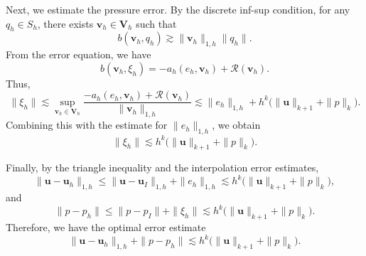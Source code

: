 \documentclass[review,hidelinks,onefignum,onetabnum]{siamart251216}
\begin{document}
Next, we estimate the pressure error. By the discrete inf-sup condition, for any \(q_h\in S_h\), there exists 
\(\boldsymbol{v}_h\in \boldsymbol{V}_h\) such that
\[
b(\boldsymbol{v}_h, q_h) \gtrsim \|\boldsymbol{v}_h\|_{1,h} \|q_h\|.
\]
From the error equation, we have
\[
b(\boldsymbol{v}_h, \xi_h) = -a_h(e_h, \boldsymbol{v}_h) + \mathcal{R}(\boldsymbol{v}_h).
\]
Thus,
\[
\|\xi_h\| 
\lesssim \sup_{\boldsymbol{v}_h\in \boldsymbol{V}_h} 
\frac{-a_h(e_h, \boldsymbol{v}_h) + \mathcal{R}(\boldsymbol{v}_h)}{\|\boldsymbol{v}_h\|_{1,h}}
\lesssim \|e_h\|_{1,h} + h^k \bigl(\|\boldsymbol{u}\|_{k+1} + \|p\|_k\bigr).
\]
Combining this with the estimate for \(\|e_h\|_{1,h}\), we obtain
\[
\|\xi_h\| \lesssim h^k \bigl(\|\boldsymbol{u}\|_{k+1} + \|p\|_k\bigr).
\]

Finally, by the triangle inequality and the interpolation error estimates,
\[
\|\boldsymbol{u} - \boldsymbol{u}_h\|_{1,h} 
\le \|\boldsymbol{u} - \boldsymbol{u}_I\|_{1,h} + \|e_h\|_{1,h} 
\lesssim h^k \bigl(\|\boldsymbol{u}\|_{k+1} + \|p\|_k\bigr),
\]
and
\[
\|p - p_h\| 
\le \|p - p_I\| + \|\xi_h\| 
\lesssim h^k \bigl(\|\boldsymbol{u}\|_{k+1} + \|p\|_k\bigr).
\]
Therefore, we have the optimal error estimate
\[
\|\boldsymbol{u} - \boldsymbol{u}_h\|_{1,h} + \|p - p_h\|
\lesssim h^k \bigl(\|\boldsymbol{u}\|_{k+1} + \|p\|_k\bigr).
\]


\end{document}
